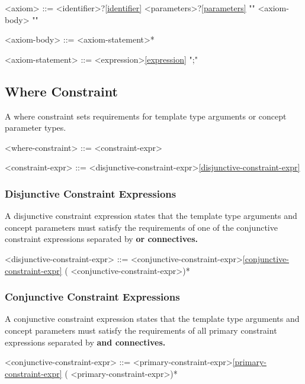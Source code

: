 \documentclass[a4paper,oneside,11pt]{article}
\begin{document}
\begin{grammar}
\label{axiom}<axiom> ::=  <identifier>?\ref{identifier} <parameters>?\ref{parameters} "{" <axiom-body> "}"

<axiom-body> ::= <axiom-statement>*

<axiom-statement> ::= <expression>\ref{expression} ";"
\end{grammar}

\subsection{Where Constraint}\label{sec:where-constraint}

A where constraint sets requirements for template type arguments or concept parameter types.

\begin{grammar}
\label{where-constraint}<where-constraint> ::=  <constraint-expr>

\label{constraint-expr}<constraint-expr> ::= <disjunctive-constraint-expr>\ref{disjunctive-constraint-expr}
\end{grammar}

\subsubsection{Disjunctive Constraint Expressions}

A disjunctive constraint expression states that the template type arguments and concept parameters must satisfy
the requirements of one of the conjunctive constraint expressions separated by \bf{or} connectives.

\begin{grammar}
\label{disjunctive-constraint-expr}<disjunctive-constraint-expr> ::= <conjunctive-constraint-expr>\ref{conjunctive-constraint-expr} ( <conjunctive-constraint-expr>)*
\end{grammar}

\subsubsection{Conjunctive Constraint Expressions}

A conjunctive constraint expression states that the template type arguments and concept parameters must satisfy
the requirements of all primary constraint expressions separated by \bf{and} connectives.

\begin{grammar}
\label{conjunctive-constraint-expr}<conjunctive-constraint-expr> ::= <primary-constraint-expr>\ref{primary-constraint-expr} ( <primary-constraint-expr>)*
\end{grammar}
\end{document}
